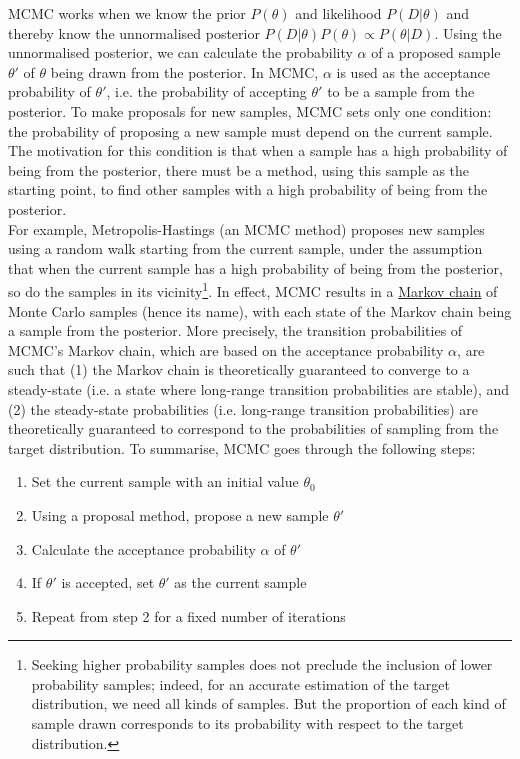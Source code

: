 \documentclass[conference]{IEEEtran}
\begin{document}
MCMC works when we know the prior $P(\theta)$ and likelihood $P(D|\theta)$ and thereby know the unnormalised posterior $P(D|\theta)P(\theta) \propto P(\theta|D)$. Using the unnormalised posterior, we can calculate the probability $\alpha$ of a proposed sample $\theta'$ of $\theta$ being drawn from the posterior. In MCMC, $\alpha$ is used as the acceptance probability of $\theta'$, i.e. the probability of accepting $\theta'$ to be a sample from the posterior. To make proposals for new samples, MCMC sets only one condition: the probability of proposing a new sample must depend on the current sample. The motivation for this condition is that when a sample has a high probability of being from the posterior, there must be a method, using this sample as the starting point, to find other samples with a high probability of being from the posterior.\\

For example, Metropolis-Hastings (an MCMC method) proposes new samples using a random walk starting from the current sample, under the assumption that when the current sample has a high probability of being from the posterior, so do the samples in its vicinity\footnote{Seeking higher probability samples does not preclude the inclusion of lower probability samples; indeed, for an accurate estimation of the target distribution, we need all kinds of samples. But the proportion of each kind of sample drawn corresponds to its probability with respect to the target distribution.}. In effect, MCMC results in a \href{https://github.com/pranigopu/mastersProject/tree/main/conceptual-notes/markov-chains}{Markov chain} of Monte Carlo samples (hence its name), with each state of the Markov chain being a sample from the posterior. More precisely, the transition probabilities of MCMC's Markov chain, which are based on the acceptance probability $\alpha$, are such that (1) the Markov chain is theoretically guaranteed to converge to a steady-state (i.e. a state where long-range transition probabilities are stable), and (2) the steady-state probabilities (i.e. long-range transition probabilities) are theoretically guaranteed to correspond to the probabilities of sampling from the target distribution. To summarise, MCMC goes through the following steps:\\

\begin{enumerate}
    \item Set the current sample with an initial value $\theta_0$
    \item Using a proposal method, propose a new sample $\theta'$
    \item Calculate the acceptance probability $\alpha$ of $\theta'$
    \item If $\theta'$ is accepted, set $\theta'$ as the current sample
    \item Repeat from step 2 for a fixed number of iterations\\
\end{enumerate}
\end{document}

